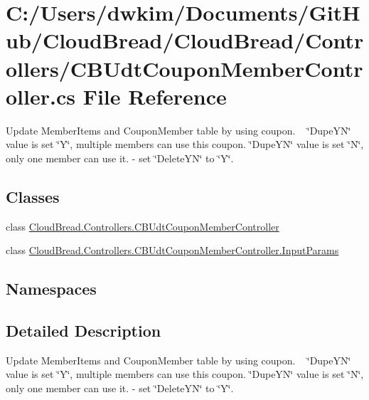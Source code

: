 \hypertarget{a00228}{}\section{C\+:/\+Users/dwkim/\+Documents/\+Git\+Hub/\+Cloud\+Bread/\+Cloud\+Bread/\+Controllers/\+C\+B\+Udt\+Coupon\+Member\+Controller.cs File Reference}
\label{a00228}


Update Member\+Items and Coupon\+Member table by using coupon. ~\newline
\char`\"{}\+Dupe\+Y\+N\char`\"{} value is set \char`\"{}\+Y\char`\"{}, multiple members can use this coupon. \char`\"{}\+Dupe\+Y\+N\char`\"{} value is set \char`\"{}\+N\char`\"{}, only one member can use it. -\/ set \char`\"{}\+Delete\+Y\+N\char`\"{} to \char`\"{}\+Y\char`\"{}.  


\subsection*{Classes}
\begin{DoxyCompactItemize}
\item 
class \hyperlink{a00057}{Cloud\+Bread.\+Controllers.\+C\+B\+Udt\+Coupon\+Member\+Controller}
\item 
class \hyperlink{a00107}{Cloud\+Bread.\+Controllers.\+C\+B\+Udt\+Coupon\+Member\+Controller.\+Input\+Params}
\end{DoxyCompactItemize}
\subsection*{Namespaces}
\begin{DoxyCompactItemize}
\end{DoxyCompactItemize}


\subsection{Detailed Description}
Update Member\+Items and Coupon\+Member table by using coupon. ~\newline
\char`\"{}\+Dupe\+Y\+N\char`\"{} value is set \char`\"{}\+Y\char`\"{}, multiple members can use this coupon. \char`\"{}\+Dupe\+Y\+N\char`\"{} value is set \char`\"{}\+N\char`\"{}, only one member can use it. -\/ set \char`\"{}\+Delete\+Y\+N\char`\"{} to \char`\"{}\+Y\char`\"{}. 

